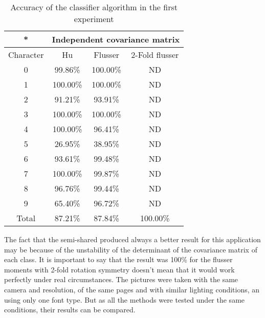 \documentclass[10pt,journal]{IEEEtran}
\begin{document}
	\begin{table}
	\begin{center}
	\begin{tabular}{|c|c|c|c|}
		\hline
		* & \multicolumn{3}{|c|}{Independent covariance matrix} \\
		\hline
		Character & Hu & Flusser & 2-Fold flusser\\
		\hline
		0 & 99.86\% & 100.00\% & ND\\
		1 &	100.00\% & 100.00\% & ND \\
		2 &	91.21\% & 93.91\% & ND \\
		3 &	100.00\% & 100.00\% & ND \\
		4 &	100.00\% & 96.41\% & ND \\		
		5 & 26.95\% & 38.95\% & ND \\ 
		6 & 93.61\% & 99.48\% & ND \\
		7 & 100.00\% & 99.87\% & ND \\
		8 & 96.76\% & 99.44\% & ND \\
		9 &	65.40\% & 96.72\% & ND \\
		\hline
		Total & 87.21\% & 87.84\% & 100.00\% \\
		\hline
	\end{tabular}
	\end{center}
	\caption{Accuracy of the classifier algorithm in the first experiment}	
	\label{exp4}
	\end{table}
	
	The fact that the semi-shared produced always a better result for this application may
	be because of the unstability of the determinant of the covariance matrix of each class.
	It is important to say that the result was 100\% for the flusser moments with 2-fold 
	rotation symmetry doesn't mean that it would work perfectly under real circumstances.
	The pictures were taken with the same camera and resolution, of the same pages and
	with similar lighting conditions, an using only one font type. But as all the methods
	were tested under the same conditions, their results can be compared.
\end{document}
